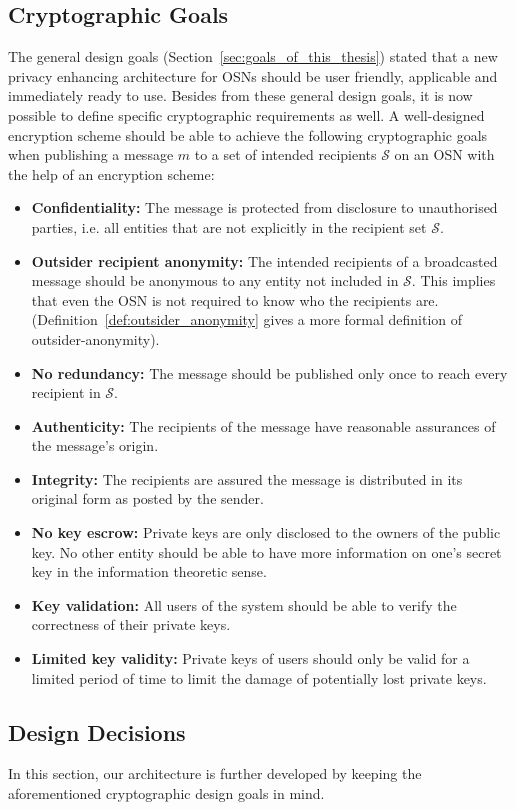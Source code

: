 \subsection{Cryptographic Goals}
\label{sec:cryptographic_goals}
The general design goals (Section~\ref{sec:goals_of_this_thesis}) stated that a new privacy enhancing architecture for OSNs should be user friendly, applicable and immediately ready to use. Besides from these general design goals, it is now possible to define specific cryptographic requirements as well. A well-designed encryption scheme should be able to achieve the following cryptographic goals when publishing a message $m$ to a set of intended recipients $\mathcal{S}$ on an OSN with the help of an encryption scheme:
\begin{itemize}
 \item \textbf{Confidentiality:} The message is protected from disclosure to unauthorised parties, i.e. all entities that are not explicitly in the recipient set $\mathcal{S}$.
 \item \textbf{Outsider recipient anonymity:} The intended recipients of a broadcasted message should be anonymous to any entity not included in $\mathcal{S}$. This implies that even the OSN is not required to know who the recipients are. (Definition~\ref{def:outsider_anonymity} gives a more formal definition of outsider-anonymity).
 \item \textbf{No redundancy:} The message should be published only once to reach every recipient in $\mathcal{S}$.
 \item \textbf{Authenticity:} The recipients of the message have reasonable assurances of the message's origin.
 \item \textbf{Integrity:} The recipients are assured the message is distributed in its original form as posted by the sender.
 \item \textbf{No key escrow:} Private keys are only disclosed to the owners of the public key. No other entity should be able to have more information on one's secret key in the information theoretic sense.
 \item \textbf{Key validation:} All users of the system should be able to verify the correctness of their private keys.
 \item \textbf{Limited key validity:} Private keys of users should only be valid for a limited period of time to limit the damage of potentially lost private keys.
\end{itemize}

\subsection{Design Decisions}
\label{sec:design_decisions}
In this section, our architecture is further developed by keeping the aforementioned cryptographic design goals in mind.

